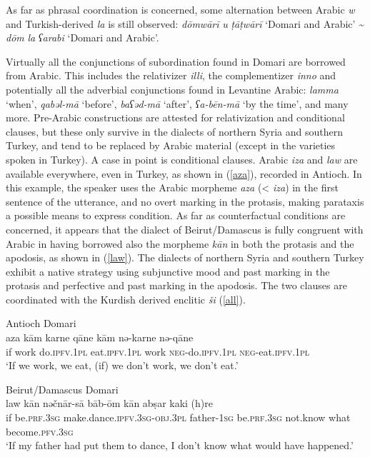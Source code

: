 \documentclass[output=paper]{langsci/langscibook}
\begin{document}
As far as phrasal coordination is concerned, some alternation between Arabic \textit{w} and Turkish-derived \textit{la} is still observed: \textit{dōmwārī} \textit{u} \textit{ṭāṭwārī} ‘Domari and Arabic’ {\textasciitilde} \textit{dōm} \textit{la} \textit{ʕarabi} ‘Domari and Arabic’.

Virtually all the conjunctions of subordination found in Domari are borrowed from Arabic. This includes the relativizer \textit{illi}, the complementizer \textit{inno} and potentially all the adverbial conjunctions found in Levantine Arabic: \textit{lamma} ‘when’, \textit{qabəl-mā} ‘before’, \textit{baʕəd-mā} ‘after’, \textit{ʕa-bēn-mā} ‘by the time’, and many more. Pre-Arabic constructions are attested for relativization and conditional clauses, but these only survive in the dialects of northern Syria and southern Turkey, and tend to be replaced by Arabic material (except in the varieties spoken in Turkey). A case in point is conditional clauses. Arabic \textit{iza} and \textit{law} are available everywhere, even in Turkey, as shown in (\ref{aza}), recorded in Antioch. In this example, the speaker uses the Arabic morpheme \textit{aza} (< \textit{iza}) in the first sentence of the utterance, and no overt marking in the protasis, making parataxis a possible means to express condition. As far as counterfactual conditions are concerned, it appears that the dialect of Beirut/Damascus is fully congruent with Arabic in having borrowed also the morpheme \textit{kān} in both the protasis and the apodosis, as shown in (\ref{law}). The dialects of northern Syria and southern Turkey exhibit a native strategy using subjunctive mood and past marking in the protasis and perfective and past marking in the apodosis. The two clauses are coordinated with the Kurdish derived enclitic \textit{ši} (\ref{all}).

\ea \label{aza}
{Antioch Domari}\\
\gll aza kām karne qāne kām nə-karne nə-qāne\\
     if work do.\textsc{ipfv.1pl} eat.\textsc{ipfv.1pl} work \textsc{neg}{}-do.\textsc{ipfv.1pl} \textsc{neg}{}-eat.\textsc{ipfv.1pl}\\
\glt ‘If we work, we eat, (if) we don’t work, we don’t eat.’
\z

\ea \label{law}
{Beirut/Damascus Domari}\\
\gll law kān nəčnār-sā bāb-ōm kān abṣar kaki (h)re\\
     if be.\textsc{prf.3sg} make.dance\textsc{.ipfv.3sg-obj.3pl} father-\textsc{1sg} be.\textsc{prf.3sg} not.know what become.\textsc{pfv.3sg}\\
\glt ‘If my father had put them to dance, I don’t know what would have happened.’
\z
\end{document}
